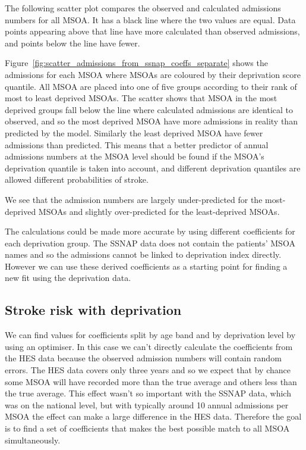 \documentclass[12pt]{extarticle}
\begin{document}
The following scatter plot compares the observed and calculated admissions numbers for all MSOA. It has a black line where the two values are equal. Data points appearing above that line have more calculated than observed admissions, and points below the line have fewer.

Figure~\ref{fig:scatter_admissions_from_ssnap_coeffs_separate} shows the admissions for each MSOA where MSOAs are coloured by their deprivation score quantile. 
All MSOA are placed into one of five groups according to their rank of most to least deprived MSOAs.
The scatter shows that MSOA in the most deprived groups fall below the line where calculated admissions are identical to observed, and so the most deprived MSOA have more admissions in reality than predicted by the model.
Similarly the least deprived MSOA have fewer admissions than predicted.
This means that a better predictor of annual admissions numbers at the MSOA level should be found if the MSOA's deprivation quantile is taken into account, and different deprivation quantiles are allowed different probabilities of stroke.


We see that the admission numbers are largely under-predicted for the most-deprived MSOAs and slightly over-predicted for the least-deprived MSOAs.

The calculations could be made more accurate by using different coefficients for each deprivation group.
The SSNAP data does not contain the patients' MSOA names and so the admissions cannot be linked to deprivation index directly.
However we can use these derived coefficients as a starting point for finding a new fit using the deprivation data.

\subsection{Stroke risk with deprivation}


We can find values for coefficients split by age band and by deprivation level by using an optimiser.
In this case we can't directly calculate the coefficients from the HES data because the observed admission numbers will contain random errors.
The HES data covers only three years and so we expect that by chance some MSOA will have recorded more than the true average and others less than the true average.
This effect wasn't so important with the SSNAP data, which was on the national level, but with typically around 10 annual admissions per MSOA the effect can make a large difference in the HES data.
Therefore the goal is to find a set of coefficients that makes the best possible match to all MSOA simultaneously.
\end{document}

